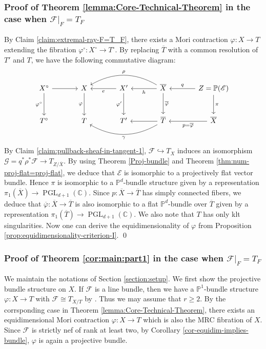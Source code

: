 \documentclass[english,reqno]{amsart}
\newcommand\bbC{{\mathbb C}}
\newcommand\bbP{{\mathbb P}}
\newcommand\sE{{\mathscr E}}
\newcommand\sF{{\mathscr F}}
\newcommand\sG{{\mathscr G}}
\DeclareMathOperator*{\PGL}{PGL}
\theoremstyle{plain}
\theoremstyle{definition}
\numberwithin{equation}{section} %
\begin{document}
\subsubsection{Proof of Theorem \ref{lemma:Core-Technical-Theorem} in the case when $\sF\vert_F=T_F$}

\label{section:step-3-case-1}

By Claim \ref{claim:extremal-ray-F=T_F}, there exists a Mori contraction $\varphi\colon X\rightarrow T$ extending the   fibration $\varphi^\circ\colon X^\circ\rightarrow T^\circ$. By replacing $\overline{T}$   with a common resolution of $T'$ and $T$, we have the following commutative diagram:
\[
\begin{tikzcd}[column sep=large, row sep=large]
X^\circ \dar[swap]{\varphi^\circ}\rar &
X\dar[swap]{\varphi} & X' \lar{e}\dar[swap]{\varphi'}
& \overline{X} \lar{h} \arrow[bend right]{ll}[swap]{\rho} \dar{\overline{\varphi}}    &
Z = \bbP(\sE)\lar[swap]{q}\dar{\pi}
\\
T^\circ & T &
T' &
\overline{T} \lar \arrow[bend left]{ll}{\gamma} &
\overline{X}\lar{p=\overline{\varphi}}
\end{tikzcd}
\]
By Claim \ref{claim:pullback-sheaf-in-tangent-1}, $\sF\hookrightarrow T_X$ induces  an isomorphism $\sG = q^*\rho^*\sF \to T_{Z/\overline{X}}$. By using
Theorem \ref{Proj-bundle} and Theorem \ref{thm:num-proj-flat=proj-flat},  we deduce that $\sE$ is isomorphic to a  projectively flat vector bundle.
Hence   $\pi$ is isomorphic to a  $\bbP^d$-bundle structure given by a representation $\pi_1(\overline{X})\rightarrow \PGL_{d+1}(\bbC)$.
Since $p\colon \overline{X}\rightarrow \overline{T}$ has simply connected fibers,  we deduce that  $\overline{\varphi}\colon \overline{X}\rightarrow \overline{T}$ is also isomorphic to a flat  $\bbP^d$-bundle over $\overline{T}$ given by a representation   $\pi_1(\overline{T})\rightarrow \PGL_{d+1}(\bbC)$. We also note that $T$ has only klt singularities. Now one can derive the equidimensionality of $\varphi$ from Proposition \ref{prop:equidimensionality-criterion-I}. \hfill \qed


\subsubsection{Proof of Theorem \ref{cor:main:part1} in the case when $\sF\vert_F=T_F$}

\label{section:step-4-case-1}
We maintain the notations of Section \ref{section:setup}.  We first show the projective bundle structure on $X$. 
If $\sF$ is a line bundle, then we have a $\bbP^1$-bundle structure $\varphi\colon X\to T$ with $\sF\cong T_{X/T}$ by \cite[Corollaire]{Druel2004}. Thus we may assume that $r\geq 2$. By the corrsponding case in Theorem \ref{lemma:Core-Technical-Theorem}, there exists an equidimensional Mori contraction $\varphi\colon X\rightarrow T$ which is also the MRC fibration of $X$. Since $\sF$ is strictly nef of rank at least two, by Corollary \ref{cor-equidim-implies-bundle}, $\varphi$ is again a projective bundle.
\end{document}
